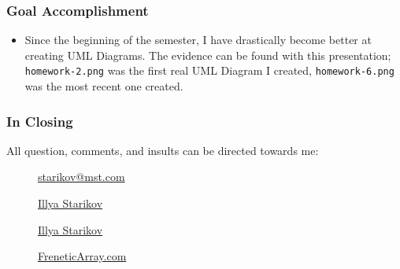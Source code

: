 \documentclass[xclolor=dvipsnames]{beamer}            %
\begin{document}
\begin{darkframes}
\begin{frame}
\begin{itemize}
        \end{itemize}
    \end{frame}

    \begin{frame}
        \frametitle{Goal Accomplishment}

        \begin{itemize}
            \item Since the beginning of the semester, I have drastically become better at creating UML Diagrams. The evidence can be found with this presentation; \texttt{homework-2.png} was the first real UML Diagram I created, \texttt{homework-6.png} was the most recent one created.
        \end{itemize}
    \end{frame}

    \begin{frame}
        \frametitle{In Closing}

        All question, comments, and insults can be directed towards me:

        \begin{center}
            \begin{description}
                \item[\faComment] \href{mailto:starikov@mst.edu}{starikov@mst.com}
                \item[\faLinkedin] \href{https://www.linkedin.com/in/illyastarikov/}{Illya Starikov}
                \item[\faGithub] \href{https://github.com/IllyaStarikov/}{Illya Starikov}
                \item[\faRss] \href{https://freneticarray.com/}{FreneticArray.com}
            \end{description}
        \end{center}
    \end{frame}
\end{darkframes}
\end{document}
